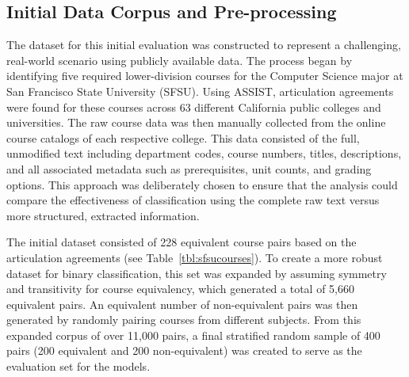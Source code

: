 \subsection{Initial Data Corpus and Pre-processing}\label{ch:3.1.1}
The dataset for this initial evaluation was constructed to represent a challenging, real-world scenario using publicly available data. The process began by identifying five required lower-division courses for the Computer Science major at San Francisco State University (SFSU). Using ASSIST, articulation agreements were found for these courses across 63 different California public colleges and universities. The raw course data was then manually collected from the online course catalogs of each respective college. This data consisted of the full, unmodified text including department codes, course numbers, titles, descriptions, and all associated metadata such as prerequisites, unit counts, and grading options. This approach was deliberately chosen to ensure that the analysis could compare the effectiveness of classification using the complete raw text versus more structured, extracted information.

The initial dataset consisted of 228 equivalent course pairs based on the articulation agreements (see Table~\ref{tbl:sfsucourses}). To create a more robust dataset for binary classification, this set was expanded by assuming symmetry and transitivity for course equivalency, which generated a total of 5,660 equivalent pairs. An equivalent number of non-equivalent pairs was then generated by randomly pairing courses from different subjects. From this expanded corpus of over 11,000 pairs, a final stratified random sample of 400 pairs (200 equivalent and 200 non-equivalent) was created to serve as the evaluation set for the models.

